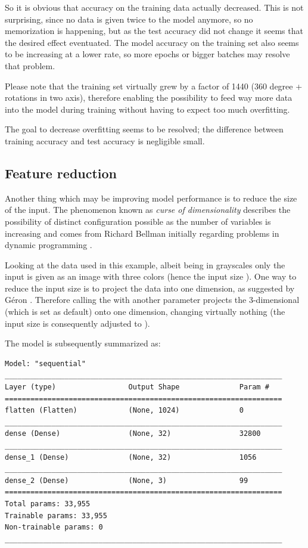 So it is obvious that accuracy on the training data actually decreased.
This is not surprising, since no data is given twice to the model anymore, so no memorization is happening, but as the test accuracy did not change it seems that the desired effect eventuated.
The model accuracy on the training set also seems to be increasing at a lower rate, so more epochs or bigger batches may resolve that problem.

Please note that the training set virtually grew by a factor of 1440 (360 degree + rotations in two axis), therefore enabling the possibility to feed way more data into the model during training without having to expect too much overfitting.

The goal to decrease overfitting seems to be resolved; the difference between training accuracy and test accuracy is negligible small.

\subsection{Feature reduction}
Another thing which may be improving model performance is to reduce the size of the input.
The phenomenon known as \textit{curse of dimensionality} describes the possibility of distinct configuration possible as the number of variables is increasing and comes from Richard Bellman initially regarding problems in dynamic programming \cite[p.ix]{Bellman1957}.

Looking at the data used in this example, albeit being in grayscales only the input is given as an image with three colors (hence the input size \code{[32, 32, 3]}).
One way to reduce the input size is to project the data into one dimension, as suggested by Géron \cite[p.215]{Geron2019}.
Therefore calling the  with another parameter  projects the 3-dimensional  (which is set as default) onto one dimension, changing virtually nothing (the input size is consequently adjusted to \code{[32, 32, 1]}).

The model is subsequently summarized as:
\begin{lstlisting}
Model: "sequential"
_________________________________________________________________
Layer (type)                 Output Shape              Param #   
=================================================================
flatten (Flatten)            (None, 1024)              0         
_________________________________________________________________
dense (Dense)                (None, 32)                32800     
_________________________________________________________________
dense_1 (Dense)              (None, 32)                1056      
_________________________________________________________________
dense_2 (Dense)              (None, 3)                 99        
=================================================================
Total params: 33,955
Trainable params: 33,955
Non-trainable params: 0
_________________________________________________________________
\end{lstlisting}

